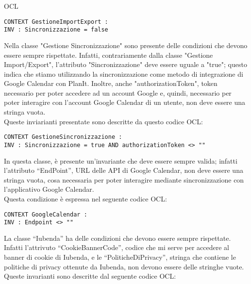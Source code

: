 \begin{listaPersonale}{OCL}
    \begin{lstlisting}
CONTEXT GestioneImportExport :
INV : Sincronizzazione = false
    \end{lstlisting}




    Nella classe "Gestione Sincronizzazione" sono presente delle condizioni che devono essere sempre rispettate. Infatti, contrariamente dalla classe "Gestione Import/Export", l'attributo "Sincronizzazione" deve essere uguale a "true"; questo indica che stiamo utilizzando la sincronizzazione come metodo di integrazione di Google Calendar con PlanIt.
    Inoltre, anche "authorizationToken", token necessario per poter accedere ad un account Google e, quindi, necessario per poter interagire con l'account Google Calendar di un utente, non deve essere una stringa vuota.\\
    Queste inviarianti presentate sono descritte da questo codice OCL: 
    \begin{lstlisting}
CONTEXT GestioneSincronizzazione :
INV : Sincronizzazione = true AND authorizationToken <> ""
    \end{lstlisting}




    In questa classe, è presente un’invariante che deve essere sempre valida; infatti l’attributo “EndPoint”, URL delle API di Google Calendar, non deve essere una stringa vuota, cosa necessaria per poter interagire mediante sincronizzazione con l’applicativo Google Calendar.\\
    Questa condizione è espressa nel seguente codice OCL:

    \begin{lstlisting}
CONTEXT GoogleCalendar :
INV : Endpoint <> ""
    \end{lstlisting}




    La classe “Iubenda” ha delle condizioni che devono essere sempre rispettate. Infatti l’attrivuto “CookieBannerCode”, codice che mi serve per accedere al banner di cookie di Iubenda, e le “PoliticheDiPrivacy”, stringa che contiene le politiche di privacy ottenute da Iubenda, non devono essere delle stringhe vuote.\\
    Queste invarianti sono descritte dal seguente codice OCL:


\end{listaPersonale}
